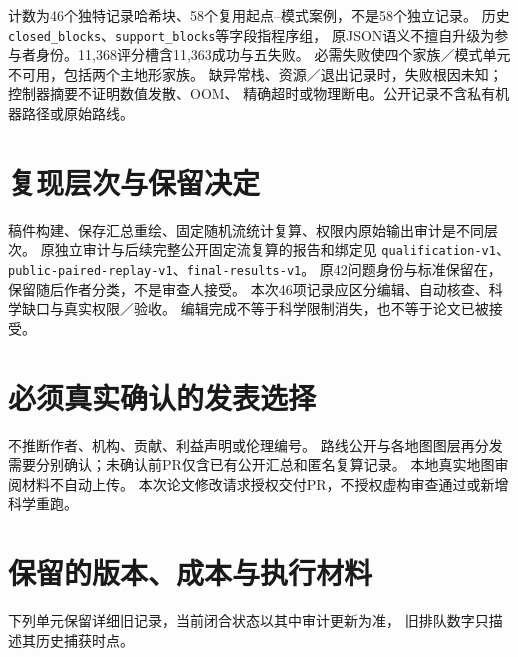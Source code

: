 计数为46个独特记录哈希块、58个复用起点--模式案例，不是58个独立记录。
历史\texttt{closed\_blocks}、\texttt{support\_blocks}等字段指程序组，
原JSON语义不擅自升级为参与者身份。11,368评分槽含11,363成功与五失败。
必需失败使四个家族／模式单元不可用，包括两个主地形家族。
缺异常栈、资源／退出记录时，失败根因未知；控制器摘要不证明数值发散、OOM、
精确超时或物理断电。公开记录不含私有机器路径或原始路线。

\section{复现层次与保留决定}
稿件构建、保存汇总重绘、固定随机流统计复算、权限内原始输出审计是不同层次。
原独立审计与后续完整公开固定流复算的报告和绑定见
\texttt{qualification-v1}、\texttt{public-paired-replay-v1}、\texttt{final-results-v1}。
原42问题身份与标准保留在，
保留随后作者分类，不是审查人接受。
本次46项记录应区分编辑、自动核查、科学缺口与真实权限／验收。
编辑完成不等于科学限制消失，也不等于论文已被接受。

\section{必须真实确认的发表选择}
不推断作者、机构、贡献、利益声明或伦理编号。
路线公开与各地图图层再分发需要分别确认；未确认前PR仅含已有公开汇总和匿名复算记录。
本地真实地图审阅材料不自动上传。
本次论文修改请求授权交付PR，不授权虚构审查通过或新增科学重跑。

\section{保留的版本、成本与执行材料}
下列单元保留详细旧记录，当前闭合状态以其中审计更新为准，
旧排队数字只描述其历史捕获时点。




